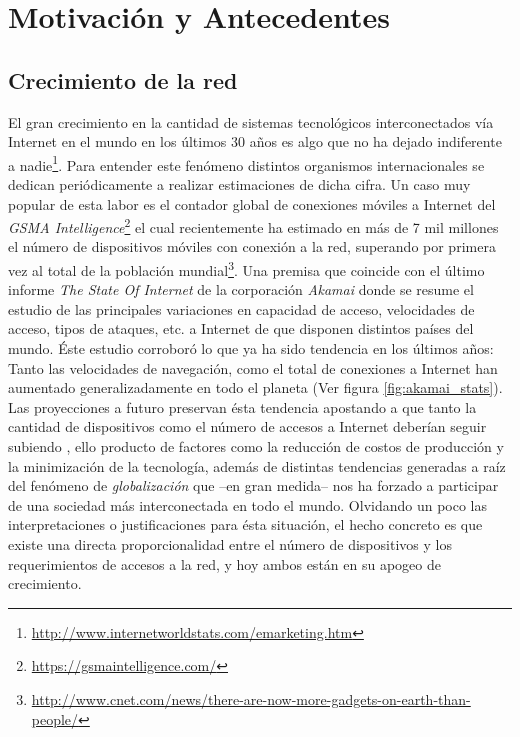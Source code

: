 \chapter{Motivación y Antecedentes}
\section{Crecimiento de la red}
El gran crecimiento en la cantidad de sistemas tecnológicos interconectados vía Internet en el mundo en los últimos 30 años es algo que no ha dejado indiferente a nadie\footnote{\url{http://www.internetworldstats.com/emarketing.htm}}. Para entender este fenómeno distintos organismos internacionales se dedican periódicamente a realizar estimaciones de dicha cifra. Un caso muy popular de esta labor es el contador global de conexiones móviles a Internet del \emph{GSMA Intelligence}\footnote{\url{https://gsmaintelligence.com/}} el cual recientemente ha estimado en más de 7 mil millones el número de dispositivos móviles con conexión a la red, superando por primera vez al total de la población mundial\footnote{\url{http://www.cnet.com/news/there-are-now-more-gadgets-on-earth-than-people/}}. Una premisa que coincide con el último informe \emph{The State Of Internet} de la corporación \emph{Akamai} \cite{report:akamai} donde se resume el estudio de las principales variaciones en capacidad de acceso, velocidades de acceso, tipos de ataques, etc. a Internet de que disponen distintos países del mundo. Éste estudio corroboró lo que ya ha sido tendencia en los últimos años: Tanto las velocidades de navegación, como el total de conexiones a Internet han aumentado generalizadamente en todo el planeta (Ver figura \ref{fig:akamai_stats}). Las proyecciones a futuro preservan ésta tendencia apostando a que tanto la cantidad de dispositivos como el número de accesos a Internet deberían seguir subiendo \cite{nota:2020}, ello producto de factores como la reducción de costos de producción y la minimización de la tecnología, además de distintas tendencias generadas a raíz del fenómeno de \emph{globalización} que --en gran medida-- nos ha forzado a participar de una sociedad más interconectada en todo el mundo. Olvidando un poco las interpretaciones o justificaciones para ésta situación, el hecho concreto es que existe una directa proporcionalidad entre el número de dispositivos y los requerimientos de accesos a la red, y hoy ambos están en su apogeo de crecimiento.

